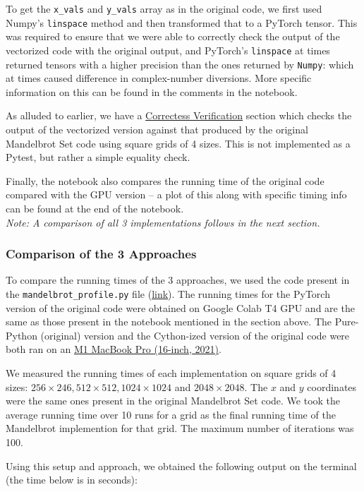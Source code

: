 \documentclass[a4paper,12pt]{article}
\begin{document}
To get the \verb|x_vals| and \verb|y_vals| array as in the original code, we first used Numpy's \verb|linspace| method and then transformed that to a PyTorch tensor. This was required to ensure that we were able to correctly check the output of the vectorized code with the original output, and PyTorch's \verb|linspace| at times returned tensors with a higher precision than the ones returned by \verb|Numpy|: which at times caused difference in complex-number diversions. More specific information on this can be found in the comments in the notebook. 

As alluded to earlier, we have a \underline{Correctess Verification} section which checks the output of the vectorized version against that produced by the original Mandelbrot Set code using square grids of 4 sizes. This is not implemented as a Pytest, but rather a simple equality check. 

Finally, the notebook also compares the running time of the original code compared with the GPU version -- a plot of this along with specific timing info can be found at the end of the notebook. \\
\textit{Note: A comparison of all 3 implementations follows in the next section.}

\subsubsection{Comparison of the 3 Approaches}
To compare the running times of the 3 approaches, we used the code present in the \verb|mandelbrot_profile.py| file (\href{https://github.com/paulmyr/DD2358-HPC25/blob/master/03_compgpu/bonus/mandelbrot_profile.py}{link}). The running times for the PyTorch version of the original code were obtained on Google Colab T4 GPU and are the same as those present in the notebook mentioned in the section above. The Pure-Python (original) version and the Cython-ized version of the original code were both ran on an \underline{M1 MacBook Pro (16-inch, 2021)}. 

We measured the running times of each implementation on square grids of 4 sizes: $256 \times 246, 512 \times 512, 1024 \times 1024$ and $2048 \times 2048$. The $x$ and $y$ coordinates were the same ones present in the original Mandelbrot Set code. We took the average running time over 10 runs for a grid as the final running time of the Mandelbrot implemention for that grid. The maximum number of iterations was 100. 

Using this setup and approach, we obtained the following output on the terminal (the time below is in seconds): 
\end{document}
